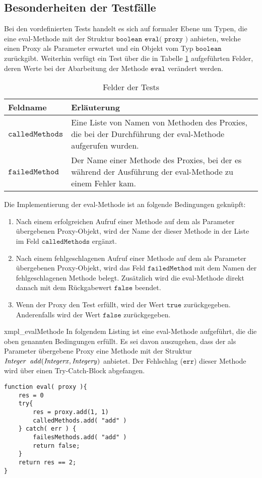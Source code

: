 \subsection{Besonderheiten der Testfälle}
Bei den vordefinierten Tests handelt es sich auf formaler Ebene um Typen, die eine eval-Methode mit der Struktur $\texttt{boolean eval( proxy )}$ anbieten, welche einen Proxy als Parameter erwartet und ein Objekt vom Typ $\texttt{boolean}$ zurückgibt. Weiterhin verfügt ein Test über die in Tabelle \ref{tab_testfelder}  aufgeführten Felder, deren Werte bei der Abarbeitung der Methode $\texttt{eval}$ verändert werden.
\begin{table}[H]
\centering
\begin{tabular}{|p{3cm}|p{10cm}|}
\hline
\hline
\textbf{Feldname} & \textbf{Erläuterung} \\
\hline
$\texttt{calledMethods}$
&
Eine Liste von Namen von Methoden des Proxies, die bei der Durchführung der eval-Methode aufgerufen wurden.
\\
\hline
$\texttt{failedMethod}$
&
Der Name einer Methode des Proxies, bei der es während der Ausführung der eval-Methode zu einem Fehler kam.
\\
\hline
\hline
\end{tabular}
\caption{Felder der Tests}
\label{tab_testfelder}
\end{table}
\noindent
Die Implementierung der eval-Methode ist an folgende Bedingungen geknüpft:
\begin{enumerate}
\item Nach einem erfolgreichen Aufruf einer Methode auf dem als Parameter übergebenen Proxy-Objekt, wird der Name der dieser Methode in der Liste im Feld $\texttt{calledMethods}$ ergänzt.
\item Nach einem fehlgeschlagenen Aufruf einer Methode auf dem als Parameter übergebenen Proxy-Objekt, wird das Feld $\texttt{failedMethod}$ mit dem Namen der fehlgeschlagenen Methode belegt. Zusätzlich wird die eval-Methode direkt danach mit dem Rückgabewert $\texttt{false}$ beendet.
\item Wenn der Proxy den Test erfüllt, wird der Wert $\texttt{true}$ zurückgegeben. Anderenfalls wird der Wert $\texttt{false}$ zurückgegeben.
\end{enumerate}

\begin{example}{xmpl_evalMethode}
In folgendem Listing ist eine eval-Methode aufgeführt, die die oben genannten Bedingungen erfüllt. Es sei davon auszugehen, dass der als Parameter übergebene Proxy eine Methode mit der Struktur $\mathit{Integer}\texttt{ }\mathit{add(Integer x, Integer y)}$
anbietet. Der Fehlschlag ($\texttt{err}$) dieser Methode wird über einen Try-Catch-Block abgefangen.
\begin{lstlisting}[style = pseudo]
function eval( proxy ){
	res = 0	
	try{
		res = proxy.add(1, 1)
		calledMethods.add( "add" )
	} catch( err ) {
		failesMethods.add( "add" )
		return false;
	}
	return res == 2;
}
\end{lstlisting}
\end{example}

